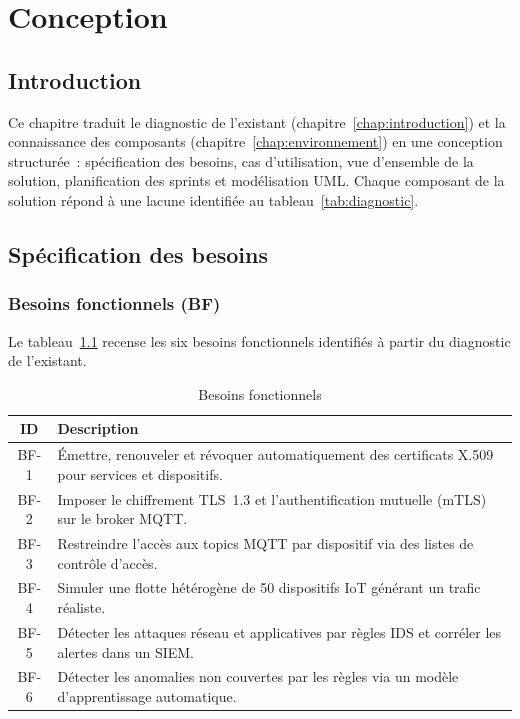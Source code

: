 \chapter{Conception}
\label{chap:conception}

\section{Introduction}
\label{sec:co-intro}

Ce chapitre traduit le diagnostic de l'existant (chapitre~\ref{chap:introduction}) et la connaissance des composants (chapitre~\ref{chap:environnement}) en une conception structurée~: spécification des besoins, cas d'utilisation, vue d'ensemble de la solution, planification des sprints et modélisation UML. Chaque composant de la solution répond à une lacune identifiée au tableau~\ref{tab:diagnostic}.

\section{Spécification des besoins}
\label{sec:co-besoins}

\subsection{Besoins fonctionnels (BF)}

Le tableau~\ref{tab:bf} recense les six besoins fonctionnels identifiés à partir du diagnostic de l'existant.

\begin{table}[!htbp]
\centering
\caption{Besoins fonctionnels}
\label{tab:bf}
\begin{tabularx}{\linewidth}{|c|>{\raggedright\arraybackslash}X|}
\hline
\textbf{ID} & \textbf{Description} \\
\hline
BF-1 & Émettre, renouveler et révoquer automatiquement des certificats X.509 pour services et dispositifs. \\ \hline
BF-2 & Imposer le chiffrement TLS~1.3 et l'authentification mutuelle (mTLS) sur le broker MQTT. \\ \hline
BF-3 & Restreindre l'accès aux topics MQTT par dispositif via des listes de contrôle d'accès. \\ \hline
BF-4 & Simuler une flotte hétérogène de 50 dispositifs IoT générant un trafic réaliste. \\ \hline
BF-5 & Détecter les attaques réseau et applicatives par règles IDS et corréler les alertes dans un SIEM. \\ \hline
BF-6 & Détecter les anomalies non couvertes par les règles via un modèle d'apprentissage automatique. \\ \hline
\end{tabularx}
\end{table}

